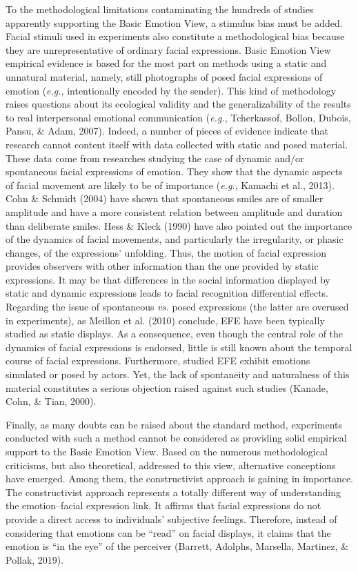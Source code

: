 \documentclass[
  english,
  doc]{apa7}
\begin{document}
To the methodological limitations contaminating the hundreds of studies apparently supporting the Basic Emotion View, a stimulus bias must be added. Facial stimuli used in experiments also constitute a methodological bias because they are unrepresentative of ordinary facial expressions. Basic Emotion View empirical evidence is based for the most part on methods using a static and unnatural material, namely, still photographs of posed facial expressions of emotion (\emph{e.g.}, intentionally encoded by the sender). This kind of methodology raises questions about its ecological validity and the generalizability of the results to real interpersonal emotional communication (\emph{e.g.}, Tcherkassof, Bollon, Dubois, Pansu, \& Adam, 2007). Indeed, a number of pieces of evidence indicate that research cannot content itself with data collected with static and posed material. These data come from researches studying the case of dynamic and/or spontaneous facial expressions of emotion. They show that the dynamic aspects of facial movement are likely to be of importance (\emph{e.g.}, Kamachi et al., 2013). Cohn \& Schmidt (2004) have shown that spontaneous smiles are of smaller amplitude and have a more consistent relation between amplitude and duration than deliberate smiles. Hess \& Kleck (1990) have also pointed out the importance of the dynamics of facial movements, and particularly the irregularity, or phasic changes, of the expressions' unfolding. Thus, the motion of facial expression provides observers with other information than the one provided by static expressions. It may be that differences in the social information displayed by static and dynamic expressions leads to facial recognition differential effects. Regarding the issue of spontaneous \emph{vs.} posed expressions (the latter are overused in experiments), as Meillon et al. (2010) conclude, EFE have been typically studied as static displays. As a consequence, even though the central role of the dynamics of facial expressions is endorsed, little is still known about the temporal course of facial expressions. Furthermore, studied EFE exhibit emotions simulated or posed by actors. Yet, the lack of spontaneity and naturalness of this material constitutes a serious objection raised against such studies (Kanade, Cohn, \& Tian, 2000).

Finally, as many doubts can be raised about the standard method, experiments conducted with such a method cannot be considered as providing solid empirical support to the Basic Emotion View. Based on the numerous methodological criticisms, but also theoretical, addressed to this view, alternative conceptions have emerged. Among them, the constructivist approach is gaining in importance. The constructivist approach represents a totally different way of understanding the emotion--facial expression link. It affirms that facial expressions do not provide a direct access to individuals' subjective feelings. Therefore, instead of considering that emotions can be ``read'' on facial displays, it claims that the emotion is ``in the eye'' of the perceiver (Barrett, Adolphs, Marsella, Martinez, \& Pollak, 2019).
\end{document}
